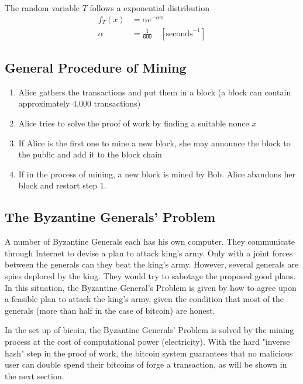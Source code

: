 \documentclass[12pt,a4paper]{article}
\begin{document}
The random variable $T$ follows a exponential distribution 
\begin{align*}
f_T(x) &= \alpha e^{-\alpha x} \\
\alpha & = \frac{1}{600} \quad [\text{seconds}^{-1}]
\end{align*}
\subsection{General Procedure of Mining}
\begin{enumerate}
	\item Alice gathers the transactions and put them in a block (a block can contain approximately 4,000 transactions)
	\item Alice tries to solve the proof of work by finding a suitable nonce $x$
	\item If Alice is the first one to mine a new block, she may announce the block to the public and add it to the block chain
	\item If in the process of mining, a new block is mined by Bob. Alice abandons her block and restart step 1.
\end{enumerate}
\subsection{The Byzantine Generals' Problem}
A number of Byzantine Generals each has his own computer. They communicate through Internet to devise a plan to attack king's army. Only with a joint forces between the generals can they beat the king's army. However, several generals are spies deplored by the king. They would try to sabotage the proposed good plans. In this situation, the Byzantine General's Problem is given by how to agree upon a feasible plan to attack the king's army, given the condition that most of the generals (more than half in the case of bitcoin) are honest.


In the set up of bicoin, the Byzantine Generals' Problem is solved by the mining process at the cost of computational power (electricity). With the hard "inverse hash" step in the proof of work, the bitcoin system guarantees that no malicious user can double spend their bitcoins of forge a transaction, as will be shown in the next section.
\end{document}
